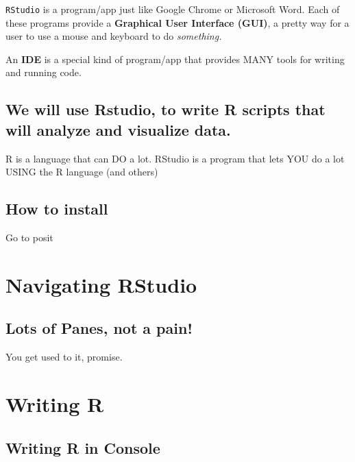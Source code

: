\documentclass[
]{book}
\begin{document}
\texttt{RStudio} is a program/app just like Google Chrome or Microsoft Word. Each
of these programs provide a \textbf{Graphical User Interface (GUI)}, a pretty way for
a user to use a mouse and keyboard to do \emph{something.}

An \textbf{IDE} is a special kind of program/app that provides MANY tools for writing and running code.

\hypertarget{we-will-use-rstudio-to-write-r-scripts-that-will-analyze-and-visualize-data.}{%
\subsection{We will use Rstudio, to write R scripts that will analyze and visualize data.}\label{we-will-use-rstudio-to-write-r-scripts-that-will-analyze-and-visualize-data.}}

R is a language that can DO a lot.
RStudio is a program that lets YOU do a lot USING the R language (and others)

\hypertarget{how-to-install}{%
\subsection{How to install}\label{how-to-install}}

Go to posit

\hypertarget{navigating-rstudio}{%
\section{Navigating RStudio}\label{navigating-rstudio}}

\hypertarget{lots-of-panes-not-a-pain}{%
\subsection{Lots of Panes, not a pain!}\label{lots-of-panes-not-a-pain}}

You get used to it, promise.

\hypertarget{writing-r}{%
\section{Writing R}\label{writing-r}}

\hypertarget{writing-r-in-console}{%
\subsection{Writing R in Console}\label{writing-r-in-console}}
\end{document}
